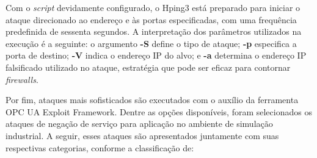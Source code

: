         Com o \textit{script} devidamente configurado, o Hping3 está preparado para iniciar o ataque direcionado ao endereço e às portas especificadas, com uma frequência predefinida de sessenta segundos. A interpretação dos parâmetros utilizados na execução é a seguinte: o argumento \textbf{-S} define o tipo de ataque; \textbf{-p} especifica a porta de destino; \textbf{-V} indica o endereço IP do alvo; e \textbf{-a} determina o endereço IP falsificado utilizado no ataque, estratégia que pode ser eficaz para contornar \textit{firewalls}.

        Por fim, ataques mais sofisticados são executados com o auxílio da ferramenta OPC UA Exploit Framework. Dentre as opções disponíveis, foram selecionados os ataques de negação de serviço para aplicação no ambiente de simulação industrial. A seguir, esses ataques são apresentados juntamente com suas respectivas categorias, conforme a classificação de:

